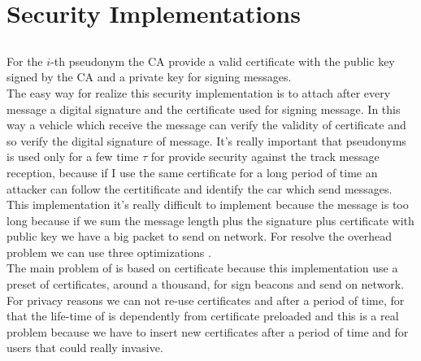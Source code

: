 \section{Security Implementations}
\subsection{\baseline}
For the $i$-th pseudonym the CA provide a valid certificate with the public key signed by the CA and a private key for signing messages.\\
The easy way for realize this security implementation is to attach after every message a digital signature and the certificate used for signing message. In this way a vehicle which receive the message can verify the validity of certificate and so verify the digital signature of message. It's really important that pseudonyms is used only for a few time $\tau$ for provide security against the track message reception, because if I use the same certificate for a long period of time an attacker can follow the certitificate and identify the car which send messages. This implementation it's really difficult to implement because the message is too long because if we sum the message length plus the signature plus certificate with public key we have a big packet to send on network. For resolve the overhead problem we can use three optimizations \cite{calandriello}.\\
The main problem of \baseline is based on certificate because this implementation use a preset of certificates, around a thousand, for sign beacons and send on network. For privacy reasons we can not re-use certificates and after a period of time, for that the life-time of \baseline is dependently from certificate preloaded and this is a real problem because we have to insert new certificates after a period of time and for users that could really invasive.